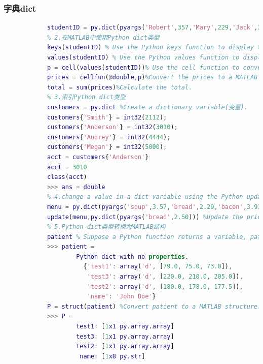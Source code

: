         \subsubsection{字典dict}
            \par
            \begin{lstlisting}[language = Matlab]
            % 1.创建Python dict类型变量
            studentID = py.dict(pyargs('Robert',357,'Mary',229,'Jack',391))
            % 2.在MATLAB中使用Python dict类型
            keys(studentID) % Use the Python keys function to display the menu items.
            values(studentID) % Use the Python values function to display the prices.
            p = cell(values(studentID))% Use the cell function to convert the Python list to a MATLAB variable.
            prices = cellfun(@double,p)%Convert the prices to a MATLAB array.
            total = sum(prices)%Calculate the total.
            % 3.索引Python dict类型
            customers = py.dict %Create a dictionary variable(变量).
            customers{'Smith'} = int32(2112);
            customers{'Anderson'} = int32(3010);
            customers{'Audrey'} = int32(4444);
            customers{'Megan'} = int32(5000);
            acct = customers{'Anderson'}
            acct = 3010
            class(acct)
            >>> ans = double
            % 4.change a value in a dict variable using the Python update method.
            menu = py.dict(pyargs('soup',3.57,'bread',2.29,'bacon',3.91,'salad',5.00));
            update(menu,py.dict(pyargs('bread',2.50))) %Update the price for bread using the Python dict type update method.
            % 5.Python dict类型转换为MATLAB结构
            patient % Suppose a Python function returns a variable, patient, with the following values.
            >>> patient =
                    Python dict with no properties.
                      {'test1': array('d', [79.0, 75.0, 73.0]),
                       'test3': array('d', [220.0, 210.0, 205.0]),
                       'test2': array('d', [180.0, 178.0, 177.5]),
                       'name': 'John Doe'}
            P = struct(patient) %Convert patient to a MATLAB structure.
            >>> P =
                    test1: [1x1 py.array.array]
                    test3: [1x1 py.array.array]
                    test2: [1x1 py.array.array]
                     name: [1x8 py.str]
            \end{lstlisting}

